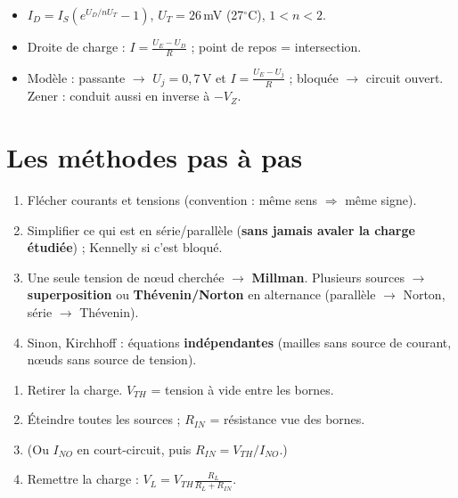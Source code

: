 \begin{thmbox}[title={Diodes (C07)}]
\begin{itemize}
  \item $I_D = I_S(e^{U_D/nU_T} - 1)$, $U_T = 26$\,mV (27\ensuremath{^\circ}C), $1<n<2$.
  \item Droite de charge : $I = \frac{U_E - U_D}{R}$ ; point de repos = intersection.
  \item Modèle : passante $\to$ $U_j = 0{,}7$\,V et $I = \frac{U_E - U_j}{R}$ ; bloquée
        $\to$ circuit ouvert. Zener : conduit aussi en inverse à $-V_Z$.
\end{itemize}
\end{thmbox}

\section{Les méthodes pas à pas}

\begin{exbox}[title={Résoudre un circuit en continu (C02, C03)}]
\begin{enumerate}
  \item Flécher courants et tensions (convention : même sens $\Rightarrow$ même signe).
  \item Simplifier ce qui est en série/parallèle (\textbf{sans jamais avaler la charge
        étudiée}) ; Kennelly si c'est bloqué.
  \item Une seule tension de n\oe ud cherchée $\to$ \textbf{Millman}. Plusieurs sources
        $\to$ \textbf{superposition} ou \textbf{Thévenin/Norton} en alternance (parallèle
        $\to$ Norton, série $\to$ Thévenin).
  \item Sinon, Kirchhoff : équations \textbf{indépendantes} (mailles sans source de
        courant, n\oe uds sans source de tension).
\end{enumerate}
\end{exbox}

\begin{exbox}[title={Trouver un modèle de Thévenin (C03)}]
\begin{enumerate}
  \item Retirer la charge. $V_{TH}$ = tension à vide entre les bornes.
  \item Éteindre toutes les sources ; $R_{IN}$ = résistance vue des bornes.
  \item (Ou $I_{NO}$ en court-circuit, puis $R_{IN} = V_{TH}/I_{NO}$.)
  \item Remettre la charge : $V_L = V_{TH}\frac{R_L}{R_L + R_{IN}}$.
\end{enumerate}
\end{exbox}

